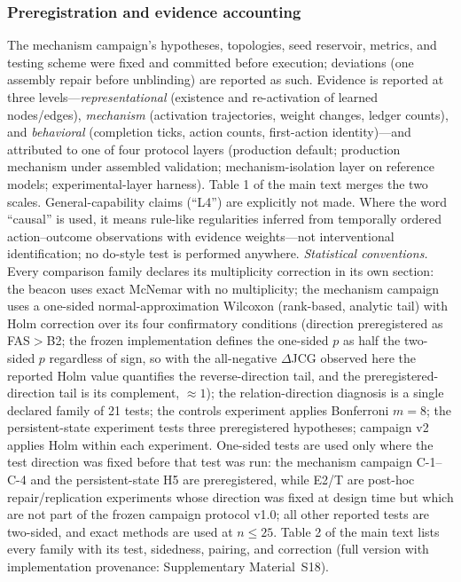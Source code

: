 \documentclass[10pt]{article}
\begin{document}
\subsubsection{Preregistration and evidence accounting}
\label{sec:method-prereg}
The mechanism campaign's hypotheses, topologies, seed reservoir, metrics, and testing scheme were fixed and committed before execution; deviations (one assembly repair before unblinding) are reported as such. Evidence is reported at three levels---\emph{representational} (existence and re-activation of learned nodes/edges), \emph{mechanism} (activation trajectories, weight changes, ledger counts), and \emph{behavioral} (completion ticks, action counts, first-action identity)---and attributed to one of four protocol layers (production default; production mechanism under assembled validation; mechanism-isolation layer on reference models; experimental-layer harness). Table 1 of the main text merges the two scales. General-capability claims (``L4'') are explicitly not made. Where the word ``causal'' is used, it means rule-like regularities inferred from temporally ordered action--outcome observations with evidence weights---not interventional identification; no do-style test is performed anywhere. \emph{Statistical conventions.} Every comparison family declares its multiplicity correction in its own section: the beacon uses exact McNemar with no multiplicity; the mechanism campaign uses a one-sided normal-approximation Wilcoxon (rank-based, analytic tail) with Holm correction over its four confirmatory conditions (direction preregistered as FAS${>}$B2; the frozen implementation defines the one-sided $p$ as half the two-sided $p$ regardless of sign, so with the all-negative $\Delta$JCG observed here the reported Holm value quantifies the reverse-direction tail, and the preregistered-direction tail is its complement, ${\approx}1$); the relation-direction diagnosis is a single declared family of 21 tests; the controls experiment applies Bonferroni $m{=}8$; the persistent-state experiment tests three preregistered hypotheses; campaign v2 applies Holm within each experiment. One-sided tests are used only where the test direction was fixed before that test was run: the mechanism campaign C-1--C-4 and the persistent-state H5 are preregistered, while E2/T are post-hoc repair/replication experiments whose direction was fixed at design time but which are not part of the frozen campaign protocol v1.0; all other reported tests are two-sided, and exact methods are used at $n{\le}25$. Table 2 of the main text lists every family with its test, sidedness, pairing, and correction (full version with implementation provenance: Supplementary Material~S18).
\end{document}
